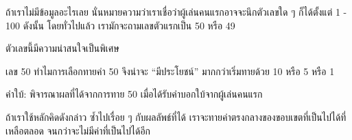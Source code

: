 ถ้า{\wbr}เรา{\wbr}ไม่{\wbr}มี{\wbr}ข้อมูล{\wbr}อะไร{\wbr}เลย นั่น{\wbr}หมายความ{\wbr}ว่า{\wbr}เรา{\wbr}เชื่อ{\wbr}ว่า{\wbr}ผู้{\wbr}เล่น{\wbr}คน{\wbr}แรก{\wbr}อาจ{\wbr}จะ{\wbr}นึก{\wbr}ตัวเลข{\wbr}ใด ๆ
ก็ได้{\wbr}ตั้งแต่ 1 - 100 ดังนั้น โดย{\wbr}ทั่วไป{\wbr}แล้ว เรา{\wbr}มักจะ{\wbr}ถาม{\wbr}เลข{\wbr}ตัว{\wbr}แรก{\wbr}เป็น 50 หรือ 49

ตัวเลข{\wbr}นี้{\wbr}มี{\wbr}ความ{\wbr}น่า{\wbr}สนใจ{\wbr}เป็นพิเศษ{\wbr}

\begin{quiz}{เลข 50}
ทำไม{\wbr}การ{\wbr}เลือก{\wbr}ทาย{\wbr}ค่า 50 จึง{\wbr}น่าจะ ``มี{\wbr}ประโยชน์'' มาก{\wbr}กว่า{\wbr}เริ่ม{\wbr}ทาย{\wbr}ด้วย 10 หรือ 5 หรือ 1

คำ{\wbr}ใบ้: พิจารณา{\wbr}ผล{\wbr}ที่{\wbr}ได้{\wbr}จาก{\wbr}การ{\wbr}ทาย 50 เมื่อ{\wbr}ได้{\wbr}รับคำ{\wbr}บอกใบ้{\wbr}จาก{\wbr}ผู้{\wbr}เล่น{\wbr}คน{\wbr}แรก{\wbr}
\end{quiz}

ถ้า{\wbr}เรา{\wbr}ใช้{\wbr}หลัก{\wbr}คิด{\wbr}ดังกล่าว ซ้ำ{\wbr}ไป{\wbr}เรื่อย ๆ กับ{\wbr}ผลลัพธ์{\wbr}ที่{\wbr}ได้{\wbr}
เรา{\wbr}จะ{\wbr}ทาย{\wbr}ค่า{\wbr}ตรง{\wbr}กลาง{\wbr}ของ{\wbr}ขอบเขต{\wbr}ที่{\wbr}เป็น{\wbr}ไป{\wbr}ได้{\wbr}ที่{\wbr}เหลือ{\wbr}ตลอด จนกว่า{\wbr}จะ{\wbr}ไม่{\wbr}มี{\wbr}ค่า{\wbr}ที่{\wbr}เป็น{\wbr}ไป{\wbr}ได้{\wbr}อีก{\wbr}

